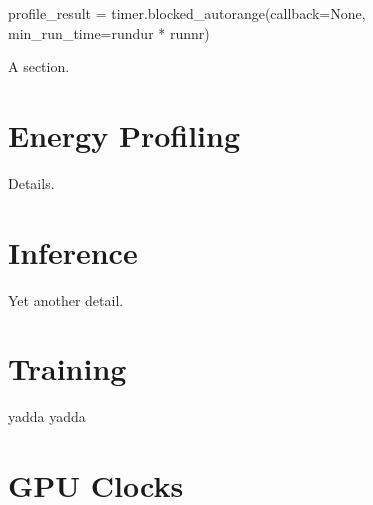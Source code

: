 profile_result = timer.blocked_autorange(callback=None, min_run_time=rundur * runnr)

A section.

\section{Energy Profiling}

Details.

\section{Inference}

Yet another detail.

\section{Training}

yadda yadda

\section{GPU Clocks}